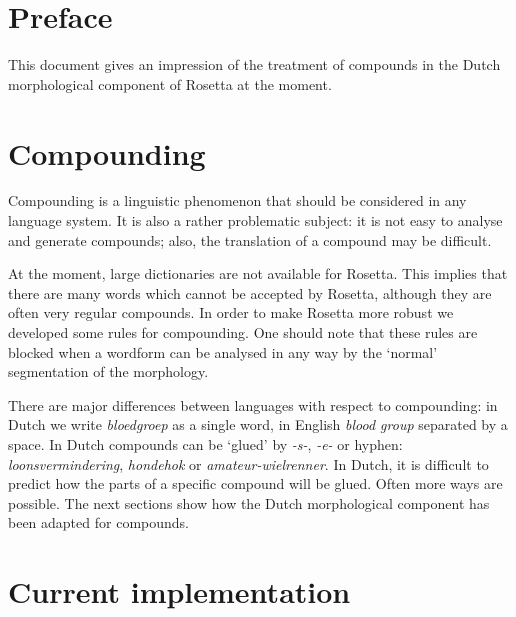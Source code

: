 
   \RosDate{\today}
   \RosSupersedes{-}
   \MakeRosTitle


\section{Preface}

This document gives an impression of the treatment of compounds 
in the Dutch morphological component of Rosetta at the moment. 

\section{Compounding}

Compounding is a linguistic phenomenon that should be considered in any 
language system. It is also a rather problematic subject: it is not easy
to analyse and generate compounds; also, the translation of a compound may be
difficult.

At the moment, large dictionaries are not available for Rosetta. This implies 
that there are many words which cannot be accepted by Rosetta, although they are
often very regular compounds. In order to make Rosetta more robust we developed
some rules for compounding. One should note that these rules are blocked when a
wordform can be analysed in any way by the `normal' segmentation of the 
morphology. 

There are major differences between languages with respect 
to compounding: 
in Dutch we write {\em bloedgroep} as a single 
word, in English {\em blood group} separated by a space. 
In Dutch compounds can 
be `glued' by {\em -s-}, {\em -e-} or hyphen: {\em loonsvermindering}, 
{\em hondehok} or {\em amateur-wielrenner}. In Dutch, it is difficult to
predict how the parts of a specific compound will be glued. Often more
ways are possible. The next sections 
show how the Dutch morphological component has been adapted for compounds.

\newpage
\section{Current implementation}

